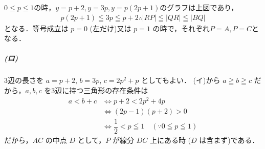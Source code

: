 \documentclass[../../main.tex]{subfiles}
\begin{document}
$0\le p\le 1$の時，$y=p+2,y=3p,y=p(2p+1)$のグラフは上図であり，
\begin{align}
  p(2p+1) \leqq 3p \leqq p+2
  \therefore
  |RP| \leqq |QR| \leqq |BQ|
\end{align}
となる．等号成立は $p=0$ (左だけ)又は $p=1$ の時で，それぞれ$P=A,P=C$となる．

\subparagraph{(ロ)}

3辺の長さを $a = p+2$, $b = 3p$, $c = 2p^2+p$ としてもよい．
(イ)から $a \geqq b \geqq c$ だから，$a, b, c$ を3辺に持つ三角形の存在条件は
\begin{align}
  a < b+c
  &\iff p+2 < 2p^2 + 4p \\
  &\iff (2p-1)(p+2) > 0 \\
  &\iff \dfrac{1}{2} < p \leqq 1 \quad (\because 0 \leqq p \leqq 1)
\end{align}
だから，$AC$ の中点 $D$ として，$P$ が線分 $DC$ 上にある時 ($D$ は含まず)である．
\end{document}
